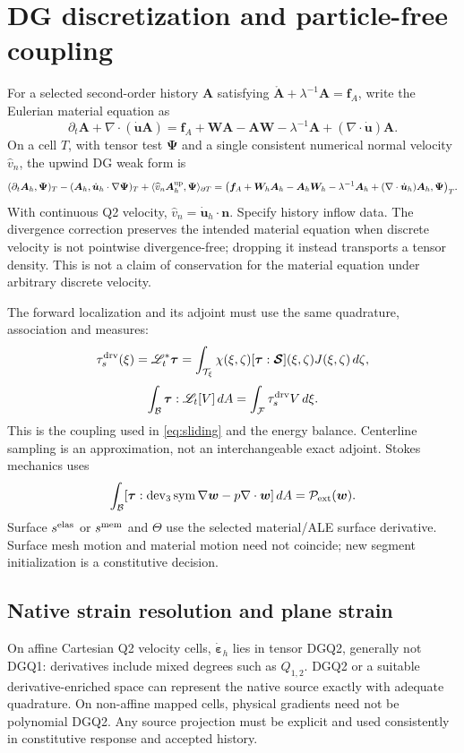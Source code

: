 \documentclass[10pt,letterpaper]{article}
\newcommand{\B}{\mathcal B}
\newcommand{\F}{\mathcal F}
\newcommand{\LL}{\mathscr L}
\newcommand{\SSS}{\bm{\mathcal S}}
\newcommand{\ta}{\bm\tau}
\newcommand{\vel}{\dot{\bm u}}
\newcommand{\erate}{\dot{\bm\varepsilon}}
\newcommand{\sel}{s^{\rm elas}}
\newcommand{\smem}{s^{\rm mem}}
\newcommand{\rr}{\mathring}
\newcommand{\dev}{\operatorname{dev}_3}
\newcommand{\sym}{\operatorname{sym}}
\begin{document}
\section{DG discretization and particle-free coupling}
For a selected second-order history $\bm A$ satisfying
$\rr{\bm A}+\lambda^{-1}\bm A=\bm f_A$, write the Eulerian material equation as
\begin{equation}
 \partial_t\bm A+\nabla\cdot(\vel\bm A)
 =\bm f_A+\bm W\bm A-\bm A\bm W-\lambda^{-1}\bm A
 +(\nabla\cdot\vel)\bm A.
\end{equation}
On a cell $T$, with tensor test $\bm\Psi$ and a single consistent numerical normal velocity $\widehat v_n$, the upwind DG weak form is
\begin{align}
 (\partial_t\bm A_h,\bm\Psi)_T-(\bm A_h,\vel_h\cdot\nabla\bm\Psi)_T
 +\langle\widehat v_n\bm A_h^{\rm up},\bm\Psi\rangle_{\partial T}
 =\big(\bm f_A+\bm W_h\bm A_h-\bm A_h\bm W_h
 -\lambda^{-1}\bm A_h+(\nabla\cdot\vel_h)\bm A_h,\bm\Psi\big)_T.
 \label{eq:DG}
\end{align}
With continuous Q2 velocity, $\widehat v_n=\vel_h\cdot\bm n$. Specify history inflow data. The divergence correction preserves the intended material equation when discrete velocity is not pointwise divergence-free; dropping it instead transports a tensor density. This is not a claim of conservation for the material equation under arbitrary discrete velocity.

The forward localization and its adjoint must use the same quadrature, association and measures:
\begin{equation}
 \tau_s^{\rm drv}(\xi)=\LL_t^*\ta
 =\int_{\mathcal T_\xi}\chi(\xi,\zeta)[\ta:\SSS](\xi,\zeta)J(\xi,\zeta)\,d\zeta,
\end{equation}
\begin{equation}
 \int_\B\ta:\LL_t[V]\,dA=\int_\F\tau_s^{\rm drv}V\,d\xi.
\end{equation}
This is the coupling used in \eqref{eq:sliding} and the energy balance. Centerline sampling is an approximation, not an interchangeable exact adjoint. Stokes mechanics uses
\begin{equation}
 \int_\B[\ta:\dev\sym\nabla\bm w-p\nabla\cdot\bm w]\,dA
 =\mathcal P_{\rm ext}(\bm w).
\end{equation}
Surface $\sel$ or $\smem$ and $\Theta$ use the selected material/ALE surface derivative. Surface mesh motion and material motion need not coincide; new segment initialization is a constitutive decision.

\subsection{Native strain resolution and plane strain}
On affine Cartesian Q2 velocity cells, $\erate_h$ lies in tensor DGQ2, generally not DGQ1: derivatives include mixed degrees such as $Q_{1,2}$. DGQ2 or a suitable derivative-enriched space can represent the native source exactly with adequate quadrature. On non-affine mapped cells, physical gradients need not be polynomial DGQ2. Any source projection must be explicit and used consistently in constitutive response and accepted history.
\end{document}
